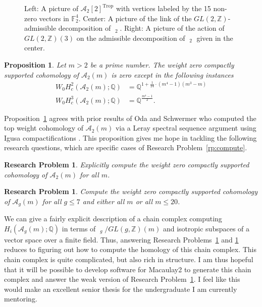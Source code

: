 \documentclass[11pt,reqno]{amsart}
\newtheorem{problem}[lemma]{Research Problem}
\newtheorem{prop}[lemma]{Proposition}
\theoremstyle{remark}
\newcommand{\GL}{{GL}}
\newcommand{\FF}{\mathbb{F}}
\newcommand{\QQ}{\mathbb{Q}}
\newcommand{\ZZ}{\mathbb{Z}}
\newcommand{\cA}{\mathcal{A}}
\DeclareMathOperator{\Trop}{Trop}
\DeclareMathOperator{\PDrt}{PD^{rt}}
\begin{document}
\begin{figure}[H]
\caption{Left: A picture of $\cA_{2}[2]^{\Trop}$ with vertices labeled by the 15 non-zero vectors in $\FF_{2}^{4}$. Center: A picture of the link of the $\GL(2,\ZZ)$-admissible decomposition of $\PDrt_{2}$. Right: A picture of the action of $\GL(2, \ZZ)(3)$ on the admissible decomposition of $\PDrt_{2}$ given in the center.}
\end{figure}

\begin{prop}\label{prop:a2m}
    Let $m>2$ be a prime number. The weight zero compactly supported cohomology of $\cA_2(m)$ is zero except in the following instances
    \begin{align*}
     W_0 H^2_c(\cA_2(m);\QQ) &= \QQ^{1+ \frac{1}{24} \cdot (m^4-1)(m^3-m)} \\
     W_0 H^3_c(\cA_2(m);\QQ) &= \QQ^{\frac{m^4-1}{2}}. 
    \end{align*}
\end{prop}

Proposition~\ref{prop:a2m} agrees with prior results of Oda and Schwermer who computed the top weight cohomology of $\cA_{2}(m)$ via a Leray spectral sequence argument using Igusa compactifications \cite[Propositions 5.3 and 5.5]{odaSchwermer90}. This proposition gives me hope in tackling the following research questions, which are specific cases of Research Problem~\ref{rp:compute}.

\begin{problem}\label{rp:a2m}
Explicitly compute the weight zero compactly supported cohomology of $\cA_{2}(m)$ for all $m$.
\end{problem}

\begin{problem}\label{rp:computing-computer}
Compute the weight zero compactly supported cohomology of $\cA_{g}(m)$ for all $g\leq 7$ and either all $m$ or all $m\leq 20$.
\end{problem}

We can give a fairly explicit description of a chain complex computing $H_{i}(\cA_{g}(m);\QQ)$ in terms of $\PDrt_{g}/\GL(g,\ZZ)(m)$ and isotropic subspaces of a vector space over a finite field. Thus, answering Research Problems~\ref{rp:a2m} and \ref{rp:computing-computer} reduces to figuring out how to compute the homology of this chain complex. This chain complex is quite complicated, but also rich in structure. I am thus hopeful that it will be possible to develop software for Macaulay2 to generate this chain complex and answer the weak version of Research Problem~\ref{rp:computing-computer}. I feel like this would make an excellent senior thesis for the undergraduate I am currently mentoring.
\end{document}
